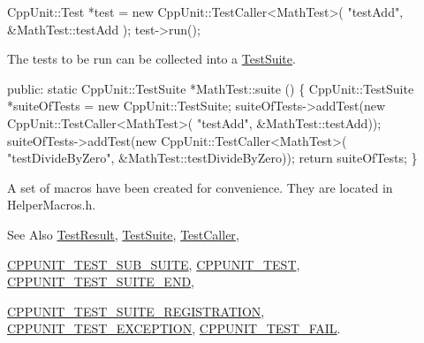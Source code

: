 \begin{DoxyCode}
CppUnit::Test *test = \textcolor{keyword}{new} CppUnit::TestCaller<MathTest>( \textcolor{stringliteral}{"testAdd"}, 
                                                         &MathTest::testAdd );
test->run();
\end{DoxyCode}


The tests to be run can be collected into a \hyperlink{class_test_suite}{Test\-Suite}.


\begin{DoxyCode}
\textcolor{keyword}{public}: 
  \textcolor{keyword}{static} CppUnit::TestSuite *MathTest::suite () \{
     CppUnit::TestSuite *suiteOfTests = \textcolor{keyword}{new} CppUnit::TestSuite;
     suiteOfTests->addTest(\textcolor{keyword}{new} CppUnit::TestCaller<MathTest>(
                             \textcolor{stringliteral}{"testAdd"}, &MathTest::testAdd));
     suiteOfTests->addTest(\textcolor{keyword}{new} CppUnit::TestCaller<MathTest>(
                             \textcolor{stringliteral}{"testDivideByZero"}, &MathTest::testDivideByZero));
     \textcolor{keywordflow}{return} suiteOfTests;
 \}
\end{DoxyCode}


A set of macros have been created for convenience. They are located in Helper\-Macros.\-h.

\begin{DoxySeeAlso}{See Also}
\hyperlink{class_test_result}{Test\-Result}, \hyperlink{class_test_suite}{Test\-Suite}, \hyperlink{class_test_caller}{Test\-Caller}, 

\hyperlink{group___writing_test_fixture_gae19f30ade82172cf6c3ff297367a10c2}{C\-P\-P\-U\-N\-I\-T\-\_\-\-T\-E\-S\-T\-\_\-\-S\-U\-B\-\_\-\-S\-U\-I\-T\-E}, \hyperlink{group___writing_test_fixture_gaac9b03d898b207e1daf2f93867935a96}{C\-P\-P\-U\-N\-I\-T\-\_\-\-T\-E\-S\-T}, \hyperlink{group___writing_test_fixture_ga601b2e1d525f3947b216e28c625abcb1}{C\-P\-P\-U\-N\-I\-T\-\_\-\-T\-E\-S\-T\-\_\-\-S\-U\-I\-T\-E\-\_\-\-E\-N\-D}, 

\hyperlink{group__inf2990_ga78226027bf3abc2f171af0825474f707}{C\-P\-P\-U\-N\-I\-T\-\_\-\-T\-E\-S\-T\-\_\-\-S\-U\-I\-T\-E\-\_\-\-R\-E\-G\-I\-S\-T\-R\-A\-T\-I\-O\-N}, \hyperlink{group___writing_test_fixture_gaca8eeb6f60714baade6cbfd185868c40}{C\-P\-P\-U\-N\-I\-T\-\_\-\-T\-E\-S\-T\-\_\-\-E\-X\-C\-E\-P\-T\-I\-O\-N}, \hyperlink{group___writing_test_fixture_ga5bdaf0444216a8f93ead13d5ae964d7e}{C\-P\-P\-U\-N\-I\-T\-\_\-\-T\-E\-S\-T\-\_\-\-F\-A\-I\-L}. 
\end{DoxySeeAlso}


